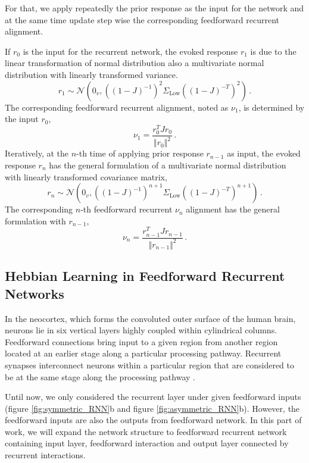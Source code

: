 \documentclass[11pt]{article}
\begin{document}
	For that, we apply repeatedly the prior response as the input for the network and at the same time update step wise the corresponding feedforward recurrent alignment. 
	
	If $r_0$ is the input for the recurrent network, the evoked response $r_1$ is due to the linear transformation of normal distribution also a multivariate normal distribution with linearly transformed variance.
		\begin{equation}
			r_1 \sim \mathcal{N}\left(0_v, \left((1-J)^{-1}\right)^2 \Sigma_{\text{Low}} \left((1-J)^{-T}\right)^2\right) \, .
		\end{equation}
	The corresponding feedforward recurrent alignment, noted as $\nu_1$, is determined by the input $r_0$,
		\begin{equation}
			\nu_1 = \frac{r_0^T J r_0}{\Vert r_0 \Vert^2}\, .
		\end{equation}
	Iteratively, at the $n$-th time of applying prior response $r_{n-1}$ as input, the evoked response $r_n$ has the general formulation of a multivariate normal distribution with linearly transformed covariance matrix,
		\begin{equation}
			r_n \sim \mathcal{N}\left( 0_v, \left((1-J)^{-1}\right)^{n+1} \Sigma_{\text{Low}} \left((1-J)^{-T}\right)^{n+1} \right) \,. 
		\end{equation}
	The corresponding $n$-th feedforward recurrent $\nu_n$ alignment has the general formulation with $r_{n-1}$,
		\begin{equation} \label{eq:update_ffrec}
			\nu_n = \frac{r_{n-1}^T J r_{n-1}}{\Vert r_{n-1} \Vert^2} \,.
		\end{equation}
	
	
	\clearpage
	\subsection{Hebbian Learning in Feedforward Recurrent Networks}
	In the neocortex, which forms the convoluted outer surface of the human brain, neurons lie in six vertical layers highly coupled within cylindrical columns. Feedforward connections bring input to a given region from another region located at an earlier stage along a particular processing pathway. Recurrent synapses interconnect neurons within a particular region that are considered to be at the same stage along the processing pathway \cite{dayan2005theoretical}. 
	
	Until now, we only considered the recurrent layer under given feedforward inputs (figure \ref{fig:symmetric_RNN}b and figure \ref{fig:asymmetric_RNN}b). However, the feedforward inputs are also the outputs from feedforward network. In this part of work, we will expand the network structure to feedforward recurrent network containing input layer, feedforward interaction and output layer connected by recurrent interactions.
	
\end{document}
